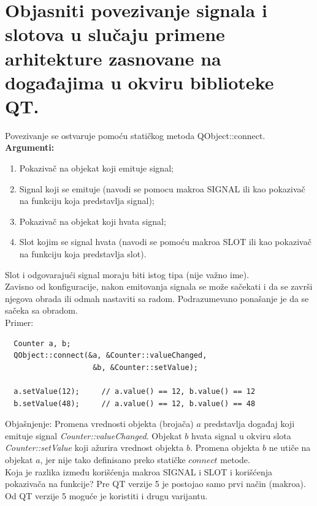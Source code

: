 \documentclass[a4paper]{article}
\begin{document}
\section{Objasniti povezivanje signala i slotova u slučaju primene arhitekture 
         zasnovane na događajima u okviru biblioteke QT.}
  Povezivanje se ostvaruje pomoću statičkog metoda QObject::connect. \\
  \textbf{Argumenti:}
  \begin{enumerate}
    \item Pokazivač na objekat koji emituje signal;
    \item Signal koji se emituje (navodi se pomocu makroa SIGNAL
          ili kao pokazivač na funkciju koja predstavlja signal);
    \item Pokazivač na objekat koji hvata signal;
    \item Slot kojim se signal hvata (navodi se pomoću makroa SLOT
          ili kao pokazivač na funkciju koja predstavlja slot).
  \end{enumerate}
  Slot i odgovarajući signal moraju biti istog tipa (nije važno ime).\\
  Zavisno od konfiguracije, nakon emitovanja signala se može sačekati i da se završi njegova obrada 
  ili odmah nastaviti sa radom. Podrazumevano ponašanje je da se sačeka sa obradom.\\
  Primer:
  \begin{lstlisting}
  Counter a, b;
  QObject::connect(&a, &Counter::valueChanged,
                    &b, &Counter::setValue);

  a.setValue(12);     // a.value() == 12, b.value() == 12
  b.setValue(48);     // a.value() == 12, b.value() == 48\end{lstlisting}
  Objašnjenje: Promena vrednosti objekta (brojača) $a$ predstavlja događaj koji emituje signal
  \textit{Counter::valueChanged}. Objekat $b$ hvata signal u okviru slota \textit{Counter::setValue}
  koji ažurira vrednost objekta $b$. Promena objekta $b$ ne utiče na objekat $a$, jer nije tako
  definisano preko statičke $connect$ metode.\\

  Koja je razlika između korišćenja makroa SIGNAL i SLOT i korišćenja pokazivača
  na funkcije? Pre QT verzije 5 je postojao samo prvi način (makroa). Od QT verzije 5 moguće
  je koristiti i drugu varijantu.
  
\end{document}
